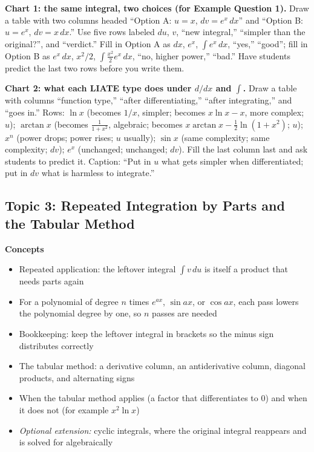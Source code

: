 \documentclass[11pt]{article}
\begin{document}
\begin{notebox}
\textbf{Chart 1: the same integral, two choices (for Example Question 1).} Draw a table with two columns headed ``Option A: $u=x$, $dv=e^x\,dx$'' and ``Option B: $u=e^x$, $dv=x\,dx$.'' Use five rows labeled $du$, $v$, ``new integral,'' ``simpler than the original?'', and ``verdict.'' Fill in Option A as $dx$, $e^x$, $\int e^x\,dx$, ``yes,'' ``good''; fill in Option B as $e^x\,dx$, $x^2/2$, $\int\frac{x^2}{2}e^x\,dx$, ``no, higher power,'' ``bad.'' Have students predict the last two rows before you write them.

\textbf{Chart 2: what each LIATE type does under $d/dx$ and $\int$.} Draw a table with columns ``function type,'' ``after differentiating,'' ``after integrating,'' and ``goes in.'' Rows: $\ln x$ (becomes $1/x$, simpler; becomes $x\ln x - x$, more complex; $u$); $\arctan x$ (becomes $\frac{1}{1+x^2}$, algebraic; becomes $x\arctan x-\frac12\ln(1+x^2)$; $u$); $x^n$ (power drops; power rises; $u$ usually); $\sin x$ (same complexity; same complexity; $dv$); $e^x$ (unchanged; unchanged; $dv$). Fill the last column last and ask students to predict it. Caption: ``Put in $u$ what gets simpler when differentiated; put in $dv$ what is harmless to integrate.''
\end{notebox}

\subsection{Topic 3: Repeated Integration by Parts and the Tabular Method}

\textbf{Concepts}
\begin{itemize}
\item Repeated application: the leftover integral $\int v\,du$ is itself a product that needs parts again
\item For a polynomial of degree $n$ times $e^{ax}$, $\sin ax$, or $\cos ax$, each pass lowers the polynomial degree by one, so $n$ passes are needed
\item Bookkeeping: keep the leftover integral in brackets so the minus sign distributes correctly
\item The tabular method: a derivative column, an antiderivative column, diagonal products, and alternating signs
\item When the tabular method applies (a factor that differentiates to $0$) and when it does not (for example $x^2\ln x$)
\item \emph{Optional extension:} cyclic integrals, where the original integral reappears and is solved for algebraically
\end{itemize}
\end{document}
